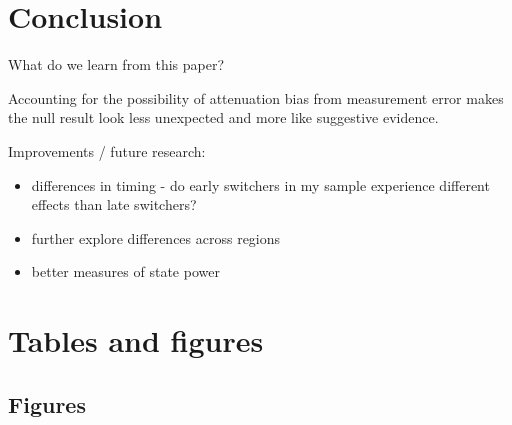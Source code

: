 \documentclass[11pt, a4paper]{article}
\begin{document}

\section{Conclusion} \label{sec:conclusion}

What do we learn from this paper? 

Accounting for the possibility of attenuation bias from measurement error makes the null result look less unexpected and more like suggestive evidence.

Improvements / future research:
\begin{itemize}
    \item differences in timing - do early switchers in my sample experience different effects than late switchers?
    \item further explore differences across regions
    \item better measures of state power
\end{itemize}

\newpage
\onehalfspacing



\newpage
\section*{Tables and figures}



\subsection*{Figures}
\end{document}
